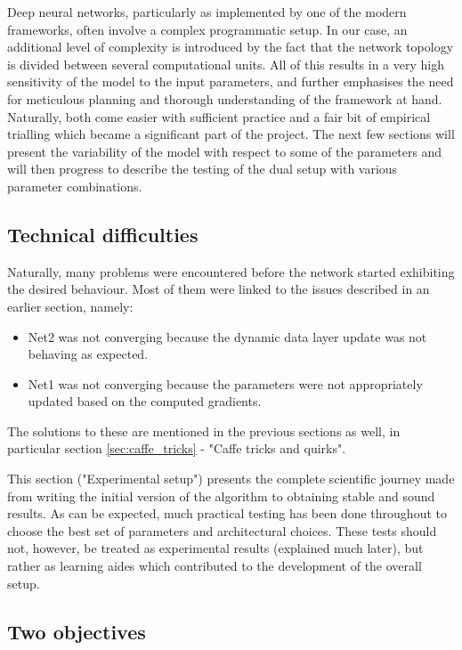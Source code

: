 \documentclass[a4paper, 12pt]{article}
\numberwithin{equation}{section}
\begin{document}
	Deep neural networks, particularly as implemented by one of the modern frameworks, often involve a complex programmatic setup. In our case, an additional level of complexity is introduced by the fact that the network topology is divided between several computational units. All of this results in a very high sensitivity of the model to the input parameters, and further emphasises the need for meticulous planning and thorough understanding of the framework at hand. Naturally, both come easier with sufficient practice and a fair bit of empirical trialling which became a significant part of the project. The next few sections will present the variability of the model with respect to some of the parameters and will then progress to describe the testing of the dual setup with various parameter combinations.

	\subsection{Technical difficulties}

	Naturally, many problems were encountered before the network started exhibiting the desired behaviour. Most of them were linked to the issues described in an earlier section, namely:

	\begin{itemize}
		\item Net2 was not converging because the dynamic data layer update was not behaving as expected.
		\item Net1 was not converging because the parameters were not appropriately updated based on the computed gradients.
	\end{itemize}

	The solutions to these are mentioned in the previous sections as well, in particular section \ref{sec:caffe_tricks} - "Caffe tricks and quirks".

	This section ("Experimental setup") presents the complete scientific journey made from writing the initial version of the algorithm to obtaining stable and sound results. As can be expected, much practical testing has been done throughout to choose the best set of parameters and architectural choices. These tests should not, however, be treated as experimental results (explained much later), but rather as learning aides which contributed to the development of the overall setup.

	\subsection{Two objectives}
\end{document}
